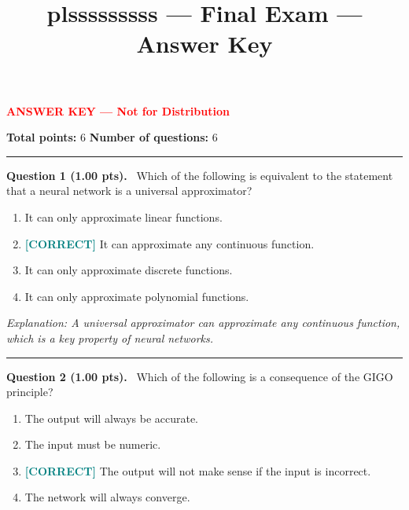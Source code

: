 \documentclass[12pt,a4paper]{article}
\title{plsssssssss — Final Exam --- Answer Key}
\date{}
\begin{document}
\maketitle

{\large \textbf{\textcolor{red}{ANSWER KEY --- Not for Distribution}}}

\vspace{0.5em}



\noindent
\textbf{Total points:} 6
\hfill
\textbf{Number of questions:} 6

\vspace{1em}
\hrule
\vspace{1.5em}


\noindent
\textbf{Question 1 (1.00 pts).}~
Which of the following is equivalent to the statement that a neural network is a universal approximator?


\begin{enumerate}[label=\textbf{\Alph*.}]

  \item It can only approximate linear functions.

  \item \textbf{\textcolor{teal}{[CORRECT]}}  It can approximate any continuous function.

  \item It can only approximate discrete functions.

  \item It can only approximate polynomial functions.

\end{enumerate}



\textit{\small Explanation: A universal approximator can approximate any continuous function, which is a key property of neural networks.}



\vspace{0.8em}
\noindent\rule{\linewidth}{0.2pt}
\vspace{0.3em}


\noindent
\textbf{Question 2 (1.00 pts).}~
Which of the following is a consequence of the GIGO principle?


\begin{enumerate}[label=\textbf{\Alph*.}]

  \item The output will always be accurate.

  \item The input must be numeric.

  \item \textbf{\textcolor{teal}{[CORRECT]}}  The output will not make sense if the input is incorrect.

  \item The network will always converge.

\end{enumerate}
\end{document}
